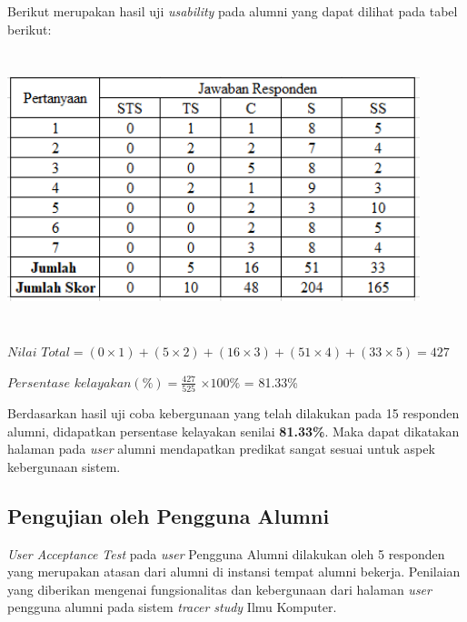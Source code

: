 \begin{enumerate}
	Berikut merupakan hasil uji \textit{usability} pada alumni yang dapat dilihat pada tabel berikut:
	
	\begin{table}[H]
		\centering
		
		\includegraphics[width=12cm,height=8cm]{gambar/UAT/hasil_u_alumni}
		\label{h_u_alumni}
	\end{table}
	
	$Nilai$ $Total = (0 \times 1) + (5 \times 2) + (16 \times 3) + (51 \times 4) + (33 \times 5) = 427$
		
	$Persentase$ $kelayakan (\%) = \frac{427}{525} $ $\times 100\%$ = 81.33\%
	
	Berdasarkan hasil uji coba kebergunaan yang telah dilakukan pada 15 responden alumni, didapatkan persentase kelayakan senilai \textbf{81.33\%}. Maka dapat dikatakan halaman pada \textit{user} alumni mendapatkan predikat sangat sesuai untuk aspek kebergunaan sistem.
	
\end{enumerate}

\subsection{Pengujian oleh Pengguna Alumni}
\textit{User Acceptance Test} pada \textit{user} Pengguna Alumni dilakukan oleh 5 responden yang merupakan atasan dari alumni di instansi tempat alumni bekerja. Penilaian yang diberikan mengenai fungsionalitas dan kebergunaan dari halaman \textit{user} pengguna alumni pada sistem \textit{tracer study} Ilmu Komputer.

